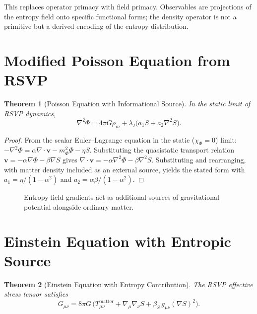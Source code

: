 \documentclass[12pt,a4paper,openany]{book}
\theoremstyle{plain}
\newtheorem{theorem}{Theorem}[chapter]
\theoremstyle{definition}
\theoremstyle{remark}
\newcommand{\RSVPContours}[2]{%
  \foreach \r in {0.45,0.90,1.35,1.80}{%
    \draw[rsvp scalar] (#1,#2) circle (\r);}}
\begin{document}
This replaces operator primacy with field primacy. Observables are projections of the entropy field onto specific functional forms; the density operator is not a primitive but a derived encoding of the entropy distribution.

\section{Modified Poisson Equation from RSVP}

\begin{theorem}[Poisson Equation with Informational Source]
\label{thm:poisson_rsvp}
In the static limit of RSVP dynamics,
\[
\nabla^2\Phi = 4\pi G\rho_m + \lambda_I\bigl(a_1 S + a_2\nabla^2 S\bigr).
\]
\end{theorem}

\begin{proof}
From the scalar Euler--Lagrange equation in the static ($\chi_\Phi = 0$) limit: $-\nabla^2\Phi = \alpha\nabla\cdot\mathbf{v} - m_\Phi^2\Phi - \eta S$. Substituting the quasistatic transport relation $\mathbf{v} = -\alpha\nabla\Phi - \beta\nabla S$ gives $\nabla\cdot\mathbf{v} = -\alpha\nabla^2\Phi - \beta\nabla^2 S$. Substituting and rearranging, with matter density included as an external source, yields the stated form with $a_1 = \eta/(1-\alpha^2)$ and $a_2 = \alpha\beta/(1-\alpha^2)$.
\end{proof}

\begin{figure}[h]
\centering
{}
\caption[Modified Poisson]{Entropy field gradients act as additional sources of gravitational potential alongside ordinary matter.}
\label{fig:poisson_entropy}
\end{figure}

\section{Einstein Equation with Entropic Source}

\begin{theorem}[Einstein Equation with Entropy Contribution]
\label{thm:einstein_entropy}
The RSVP effective stress tensor satisfies
\[
G_{\mu\nu} = 8\pi G\,\bigl(T_{\mu\nu}^{\mathrm{matter}} + \nabla_\mu\nabla_\nu S + \beta_S\,g_{\mu\nu}(\nabla S)^2\bigr).
\]
\end{theorem}
\end{document}
